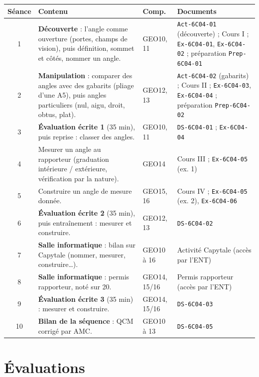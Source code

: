 \documentclass[11pt]{article}
\newcommand{\doc}[1]{\texttt{\small #1}}
\begin{document}
\renewcommand{\arraystretch}{1.3}
\begin{tabularx}{\linewidth}{|c|>{\raggedright\arraybackslash}X|>{\centering\arraybackslash}p{1.9cm}|>{\raggedright\arraybackslash}p{5.6cm}|}
\hline
\textbf{Séance} & \textbf{Contenu} & \textbf{Comp.} & \textbf{Documents} \\ \hline
1 & \textbf{Découverte} : l'angle comme ouverture (portes, champs de vision), puis définition, sommet et côtés, nommer un angle. & GEO10, 11 &
\doc{Act-6C04-01} (découverte) ; Cours I ; \doc{Ex-6C04-01}, \doc{Ex-6C04-02} ; préparation \doc{Prep-6C04-01} \\ \hline
2 & \textbf{Manipulation} : comparer des angles avec des gabarits (pliage d'une A5), puis angles particuliers (nul, aigu, droit, obtus, plat). & GEO12, 13 &
\doc{Act-6C04-02} (gabarits) ; Cours II ; \doc{Ex-6C04-03}, \doc{Ex-6C04-04} ; préparation \doc{Prep-6C04-02} \\ \hline
3 & \textbf{Évaluation écrite 1} (35 min), puis reprise : classer des angles. & GEO10, 11 &
\doc{DS-6C04-01} ; \doc{Ex-6C04-04} \\ \hline
4 & Mesurer un angle au rapporteur (graduation intérieure / extérieure, vérification par la nature). & GEO14 &
Cours III ; \doc{Ex-6C04-05} (ex. 1) \\ \hline
5 & Construire un angle de mesure donnée. & GEO15, 16 &
Cours IV ; \doc{Ex-6C04-05} (ex. 2), \doc{Ex-6C04-06} \\ \hline
6 & \textbf{Évaluation écrite 2} (35 min), puis entraînement : mesurer et construire. & GEO12, 13 &
\doc{DS-6C04-02} \\ \hline
7 & \textbf{Salle informatique} : bilan sur Capytale (nommer, mesurer, construire\ldots). & GEO10 à 16 &
Activité Capytale (accès par l'ENT) \\ \hline
8 & \textbf{Salle informatique} : permis rapporteur, noté sur 20. & GEO14, 15/16 &
Permis rapporteur (accès par l'ENT) \\ \hline
9 & \textbf{Évaluation écrite 3} (35 min) : mesurer et construire. & GEO14, 15/16 &
\doc{DS-6C04-03} \\ \hline
10 & \textbf{Bilan de la séquence} : QCM corrigé par AMC. & GEO10 à 13 &
\doc{DS-6C04-05} \\ \hline
\end{tabularx}

\section*{Évaluations}
\end{document}
